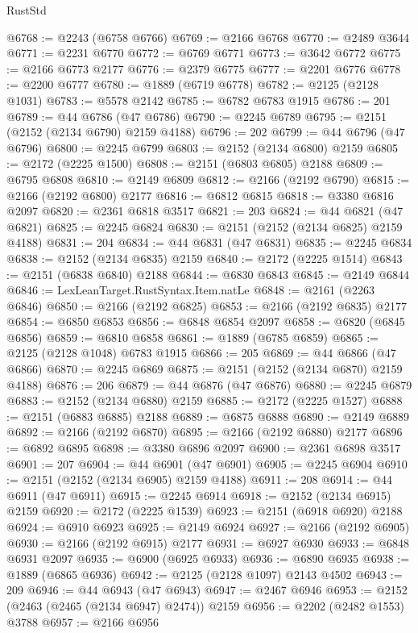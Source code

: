 \begin{lexlean}{RustStd}
\begin{coremodule}
@6768 := @2243 (@6758 @6766)
@6769 := @2166 @6768
@6770 := @2489 @3644
@6771 := @2231 @6770
@6772 := @6769 @6771
@6773 := @3642 @6772
@6775 := @2166 @6773 @2177
@6776 := @2379 @6775
@6777 := @2201 @6776
@6778 := @2200 @6777
@6780 := @1889 (@6719 @6778)
@6782 := @2125 (@2128 @1031)
@6783 := @5578 @2142
@6785 := @6782 @6783 @1915
@6786 := 201
@6789 := @44 @6786 (@47 @6786)
@6790 := @2245 @6789
@6795 := @2151 (@2152 (@2134 @6790) @2159 @4188)
@6796 := 202
@6799 := @44 @6796 (@47 @6796)
@6800 := @2245 @6799
@6803 := @2152 (@2134 @6800) @2159
@6805 := @2172 (@2225 @1500)
@6808 := @2151 (@6803 @6805) @2188
@6809 := @6795 @6808
@6810 := @2149 @6809
@6812 := @2166 (@2192 @6790)
@6815 := @2166 (@2192 @6800) @2177
@6816 := @6812 @6815
@6818 := @3380 @6816 @2097
@6820 := @2361 @6818 @3517
@6821 := 203
@6824 := @44 @6821 (@47 @6821)
@6825 := @2245 @6824
@6830 := @2151 (@2152 (@2134 @6825) @2159 @4188)
@6831 := 204
@6834 := @44 @6831 (@47 @6831)
@6835 := @2245 @6834
@6838 := @2152 (@2134 @6835) @2159
@6840 := @2172 (@2225 @1514)
@6843 := @2151 (@6838 @6840) @2188
@6844 := @6830 @6843
@6845 := @2149 @6844
@6846 := LexLeanTarget.RustSyntax.Item.natLe
@6848 := @2161 (@2263 @6846)
@6850 := @2166 (@2192 @6825)
@6853 := @2166 (@2192 @6835) @2177
@6854 := @6850 @6853
@6856 := @6848 @6854 @2097
@6858 := @6820 (@6845 @6856)
@6859 := @6810 @6858
@6861 := @1889 (@6785 @6859)
@6865 := @2125 (@2128 @1048) @6783 @1915
@6866 := 205
@6869 := @44 @6866 (@47 @6866)
@6870 := @2245 @6869
@6875 := @2151 (@2152 (@2134 @6870) @2159 @4188)
@6876 := 206
@6879 := @44 @6876 (@47 @6876)
@6880 := @2245 @6879
@6883 := @2152 (@2134 @6880) @2159
@6885 := @2172 (@2225 @1527)
@6888 := @2151 (@6883 @6885) @2188
@6889 := @6875 @6888
@6890 := @2149 @6889
@6892 := @2166 (@2192 @6870)
@6895 := @2166 (@2192 @6880) @2177
@6896 := @6892 @6895
@6898 := @3380 @6896 @2097
@6900 := @2361 @6898 @3517
@6901 := 207
@6904 := @44 @6901 (@47 @6901)
@6905 := @2245 @6904
@6910 := @2151 (@2152 (@2134 @6905) @2159 @4188)
@6911 := 208
@6914 := @44 @6911 (@47 @6911)
@6915 := @2245 @6914
@6918 := @2152 (@2134 @6915) @2159
@6920 := @2172 (@2225 @1539)
@6923 := @2151 (@6918 @6920) @2188
@6924 := @6910 @6923
@6925 := @2149 @6924
@6927 := @2166 (@2192 @6905)
@6930 := @2166 (@2192 @6915) @2177
@6931 := @6927 @6930
@6933 := @6848 @6931 @2097
@6935 := @6900 (@6925 @6933)
@6936 := @6890 @6935
@6938 := @1889 (@6865 @6936)
@6942 := @2125 (@2128 @1097) @2143 @4502
@6943 := 209
@6946 := @44 @6943 (@47 @6943)
@6947 := @2467 @6946
@6953 := @2152 (@2463 (@2465 (@2134 @6947) @2474)) @2159
@6956 := @2202 (@2482 @1553) @3788
@6957 := @2166 @6956

\end{coremodule}
\end{lexlean}
